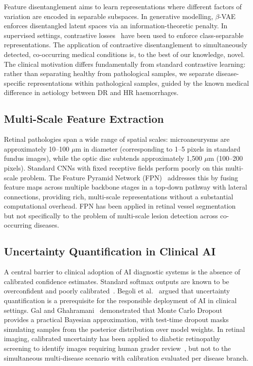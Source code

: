\documentclass[review,12pt]{elsarticle}
\begin{document}
Feature disentanglement aims to learn representations where different factors
of variation are encoded in separable subspaces. In generative modelling,
$\beta$-VAE~\cite{higgins2017} enforces disentangled latent spaces via an
information-theoretic penalty.
In supervised settings, contrastive losses~\cite{khosla2020} have been used
to enforce class-separable representations. The application of contrastive
disentanglement to simultaneously detected, co-occurring medical conditions
is, to the best of our knowledge, novel. The clinical motivation differs
fundamentally from standard contrastive learning: rather than separating
healthy from pathological samples, we separate disease-specific representations
within pathological samples, guided by the known medical difference in
aetiology between DR and HR haemorrhages.

\subsection{Multi-Scale Feature Extraction}

Retinal pathologies span a wide range of spatial scales: microaneurysms are
approximately 10--100 $\mu$m in diameter (corresponding to 1--5 pixels in
standard fundus images), while the optic disc subtends approximately 1,500 $\mu$m
(100--200 pixels). Standard CNNs with fixed receptive fields perform poorly on
this multi-scale problem. The Feature Pyramid Network (FPN)~\cite{lin2017fpn}
addresses this by fusing feature maps across multiple backbone stages in a
top-down pathway with lateral connections, providing rich, multi-scale
representations without a substantial computational overhead. FPN has been
applied in retinal vessel segmentation~\cite{meyer2021} but not specifically
to the problem of multi-scale lesion detection across co-occurring
diseases.

\subsection{Uncertainty Quantification in Clinical AI}

A central barrier to clinical adoption of AI diagnostic systems is the absence
of calibrated confidence estimates. Standard softmax outputs are known to be
overconfident and poorly calibrated~\cite{guo2017}. Begoli et
al.~\cite{begoli2019} argued that uncertainty quantification is a prerequisite
for the responsible deployment of AI in clinical settings. Gal and
Ghahramani~\cite{gal2016} demonstrated that Monte Carlo Dropout provides a
practical Bayesian approximation, with test-time dropout masks simulating
samples from the posterior distribution over model weights. In retinal imaging,
calibrated uncertainty has been applied to diabetic retinopathy screening to
identify images requiring human grader review~\cite{leibig2017}, but not to
the simultaneous multi-disease scenario with calibration evaluated per disease
branch.
\end{document}
